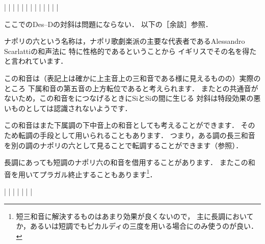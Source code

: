\documentclass[dvipdfmx,uplatex,b5paper,openany,jbase=12Q,nomag*,textwidth-limit=44%
               ]{gachimuchi}[2020/05/05]
\begin{document}
\begin{Music}
  \generalmeter{\meterC}%
  \Startpiece
  \NOTes%
  |\en%
  \NOTes%
  |\en%
  \bar%
  \NOTEs%
  |%
  \en\doublebar%
  \NOTes%
  |%
  \en\bar%
  \NOTes%
  |%
  \en\bar%
  \NOTEs%
  |%
  \en\doublebar%
  \NOTes%
  |\en%
  \NOTes%
  |\en%
  \bar%
  \NOTEs%
  |%
  \en\setdoublebar%
  \endpiece%
\end{Music}
\begin{NB}
ここでのDes--Dの対斜は問題にならない．
以下の［余談］参照．
\end{NB}

\begin{Yodan}
ナポリの六という名称は，ナポリ歌劇楽派の主要な代表者であるAlessandro Scarlattiの和声法に
特に性格的であるということから
イギリスでその名を得たと言われています\cite[p.211]{chTHUILLE1}．

この和音は（表記上は確かに上主音上の三和音である様に見えるものの）実際のところ
下属和音の第五音の上方転位であると考えられます\cite[p.211]{chTHUILLE1}．
また\Gnv との共通音がないため，この和音を\Gnv につなげるときにSi\aFlat とSi\aNatural の間に生じる
対斜は特段効果の悪いものとしては認識されないようです．

この和音はまた下属調の下中音上の和音としても考えることができます．
そのため転調の手段として用いられることもあります．
つまり，ある調の長三和音を別の調のナポリの六として見ることで転調することができます（参照）．
\end{Yodan}

長調にあっても短調のナポリ六の和音を借用することがあります．
またこの和音を用いてプラガル終止することもあります\footnote{%
  短三和音に解決するものはあまり効果が良くないので，
  主に長調においてか，あるいは短調でもピカルディの三度を用いる場合にのみ使うのが良い．
}．
\begin{Music}[0.6\linewidth]
  \generalmeter{\meterC}
  \Startpiece
  \NOTes%
  |\en%
  \NOTes%
  |\en%
  \bar%
  \NOTEs%
  |%
  \en\doublebar%
  \NOTes%
  |%
  \en\bar%
  \NOTEs%
  |%
  \en\setdoublebar%
  \endpiece%
\end{Music}
\end{document}

